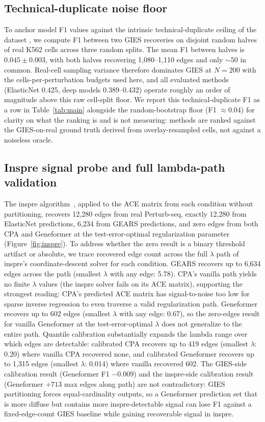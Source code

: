 \documentclass{article}
\theoremstyle{plain}
\theoremstyle{definition}
\theoremstyle{remark}
\begin{document}
\subsection{Technical-duplicate noise floor}
\label{sec:noisefloor}
To anchor model F1 values against the intrinsic technical-duplicate ceiling of the dataset \citep{mejia2025diversity,miller2025calibrated}, we compute F1 between two GIES recoveries on disjoint random halves of real K562 cells across three random splits. The mean F1 between halves is $0.045 \pm 0.003$, with both halves recovering 1{,}080--1{,}110 edges and only $\sim$50 in common. Real-cell sampling variance therefore dominates GIES at $N{=}200$ with the cells-per-perturbation budgets used here, and all evaluated methods (ElasticNet 0.425, deep models 0.389--0.432) operate roughly an order of magnitude above this raw cell-split floor. We report this technical-duplicate F1 as a row in Table~\ref{tab:main} alongside the random-bootstrap floor (F1 $\approx 0.04$) for clarity on what the ranking is and is not measuring: methods are ranked against the GIES-on-real ground truth derived from overlay-resampled cells, not against a noiseless oracle.

\subsection{Inspre signal probe and full lambda-path validation}
The inspre algorithm~\citep{brown2025inspre}, applied to the ACE matrix from each condition without partitioning, recovers 12{,}280 edges from real Perturb-seq, exactly 12{,}280 from ElasticNet predictions, 6{,}234 from GEARS predictions, and zero edges from both CPA and Geneformer at the test-error-optimal regularization parameter (Figure~\ref{fig:inspre}). To address whether the zero result is a binary threshold artifact or absolute, we trace recovered edge count across the full $\lambda$ path of inspre's coordinate-descent solver for each condition. GEARS recovers up to 6{,}634 edges across the path (smallest $\lambda$ with any edge: 5.78). CPA's vanilla path yields no finite $\lambda$ values (the inspre solver fails on its ACE matrix), supporting the strongest reading: CPA's predicted ACE matrix has signal-to-noise too low for sparse inverse regression to even traverse a valid regularization path. Geneformer recovers up to 602 edges (smallest $\lambda$ with any edge: 0.67), so the zero-edges result for vanilla Geneformer at the test-error-optimal $\lambda$ does not generalize to the entire path. Quantile calibration substantially expands the lambda range over which edges are detectable: calibrated CPA recovers up to 419 edges (smallest $\lambda$: 0.20) where vanilla CPA recovered none, and calibrated Geneformer recovers up to 1{,}315 edges (smallest $\lambda$: 0.014) where vanilla recovered 602. The GIES-side calibration result (Geneformer F1 $-0.009$) and the inspre-side calibration result (Geneformer $+713$ max edges along path) are not contradictory: GIES partitioning forces equal-cardinality outputs, so a Geneformer prediction set that is more diffuse but contains more inspre-detectable signal can lose F1 against a fixed-edge-count GIES baseline while gaining recoverable signal in inspre.
\end{document}
